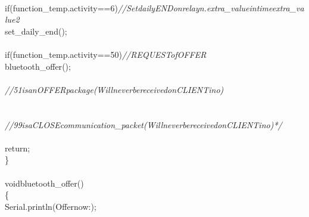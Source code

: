 \documentclass[a4paper, 12pt]{article}
\newcommand\SPC{\hspace*{0.6em}}
\newcommand\TAB{\hspace*{1.2em}}
\newcommand\QOT{\mbox{\char 34}}
\newcommand{\CppAComment}[1]{\textit{\textcolor[rgb]{0.2,0.4,1}{#1}}}
\newcommand{\CppAIdentifier}[1]{\textcolor[rgb]{0,1,0}{#1}}
\newcommand{\CppANumber}[1]{\textcolor[rgb]{0,0,1}{#1}}
\newcommand{\CppAReservedWord}[1]{\textcolor[rgb]{0,0.5,0}{#1}}
\newcommand{\CppASpace}[1]{\textcolor[rgb]{1,1,1}{\colorbox[rgb]{0,0,0}{#1}}}
\newcommand{\CppAString}[1]{\textcolor[rgb]{0.76,0.76,0.76}{#1}}
\newcommand{\CppASymbol}[1]{\textcolor[rgb]{1,0,0}{#1}}
\begin{document}
\begin{ttfamily}
\\
\CppASpace{\SPC \SPC }\CppAReservedWord{if}\CppASpace{\SPC }\CppASymbol{(}\CppAIdentifier{function\_temp}\CppASymbol{.}\CppAIdentifier{activity}\CppASpace{\SPC }\CppASymbol{==}\CppASpace{\SPC }\CppANumber{6}\CppASpace{\SPC }\CppASymbol{)}\CppASpace{\SPC }\CppAComment{//\SPC Set\SPC daily\SPC END\SPC on\SPC relay\SPC n.\SPC extra\_value\SPC in\SPC time\SPC extra\_value2}\\
\CppASpace{\SPC \SPC \SPC \SPC \SPC \SPC }\CppAIdentifier{set\_daily\_end}\CppASymbol{(}\CppASymbol{)}\CppASymbol{;}\\
\\
\CppASpace{\SPC \SPC }\CppAReservedWord{if}\CppASpace{\SPC }\CppASymbol{(}\CppAIdentifier{function\_temp}\CppASymbol{.}\CppAIdentifier{activity}\CppASpace{\SPC }\CppASymbol{==}\CppASpace{\SPC }\CppANumber{50}\CppASpace{\SPC }\CppASymbol{)}\CppASpace{\SPC }\CppAComment{//\SPC REQUEST\SPC of\SPC OFFER\SPC }\\
\CppASpace{\SPC \SPC \SPC \SPC \SPC \SPC }\CppAIdentifier{bluetooth\_offer}\CppASymbol{(}\CppASymbol{)}\CppASymbol{;}\\
\\
\CppASpace{\SPC \SPC \SPC \SPC \SPC \SPC \SPC \SPC \SPC \SPC \SPC \SPC \SPC \SPC \SPC \SPC \SPC \SPC \SPC \SPC \SPC }\CppAComment{//\SPC 51\SPC is\SPC an\SPC OFFER\SPC package\SPC (Will\SPC never\SPC be\SPC received\SPC on\SPC CLIENTino)}\\
\CppASpace{\SPC \SPC \SPC \SPC \SPC \SPC \SPC \SPC \SPC \SPC \SPC \SPC \SPC \SPC \SPC \SPC \SPC \SPC \SPC }\\
\CppASpace{\SPC \SPC \SPC \SPC \SPC \SPC \SPC \SPC \SPC \SPC \SPC \SPC \SPC \SPC \SPC \SPC }\\
\CppASpace{\SPC \SPC \SPC \SPC \SPC \SPC \SPC \SPC \SPC \SPC \SPC \SPC \SPC \SPC \SPC \SPC \SPC \SPC \SPC \SPC \SPC }\CppAComment{//\SPC 99\SPC is\SPC a\SPC CLOSE\SPC communication\_packet\SPC (Will\SPC never\SPC be\SPC received\SPC on\SPC CLIENTino)*/}\\
\\
\CppASpace{\TAB }\CppAReservedWord{return}\CppASymbol{;}\\
\CppASymbol{\}}\\
\\
\CppAReservedWord{void}\CppASpace{\SPC }\CppAIdentifier{bluetooth\_offer}\CppASymbol{(}\CppASymbol{)}\\
\CppASymbol{\{}\\
\CppASpace{\SPC \SPC }\CppAIdentifier{Serial}\CppASymbol{.}\CppAIdentifier{println}\CppASymbol{(}\CppAString{\QOT Offer\SPC now\SPC :\QOT }\CppASymbol{)}\CppASymbol{;}\\

\end{ttfamily}
\end{document}
